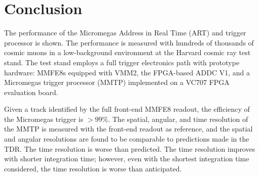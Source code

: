 \section{Conclusion}
\label{sec:conclusions}

The performance of the Micromegas Address in Real Time (ART) and trigger processor is shown. The performance is measured with hundreds of thousands of cosmic muons in a low-background environment at the Harvard cosmic ray test stand. The test stand employs a full trigger electronics path with prototype hardware: MMFE8s equipped with VMM2, the FPGA-based ADDC V1, and a Micromegas trigger processor (MMTP) implemented on a VC707 FPGA evaluation board.

Given a track identified by the full front-end MMFE8 readout, the efficiency of the Micromegas trigger is $>\! 99\%$. The spatial, angular, and time resolution of the MMTP is measured with the front-end readout as reference, and the spatial and angular resolutions are found to be comparable to predictions made in the TDR. The time resolution is worse than predicted. The time resolution improves with shorter integration time; however, even with the shortest integration time considered, the time resolution is worse than anticipated.


